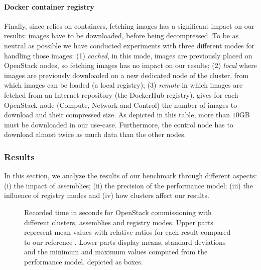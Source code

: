 \paragraph{Docker container registry}
Finally, since \kolla relies on \docker containers, fetching \docker images has a
significant impact on our results: images have to be downloaded, before being
decompressed. To be as neutral as possible we have conducted experiments with
three different modes for handling those images: (1) \emph{cached}, in this mode,
images are previously placed on OpenStack nodes, so fetching \docker images has
no impact on our results; (2) \emph{local} where images are previously
downloaded on a new dedicated node of the cluster, from which images can be
loaded (\ie a local \docker registry); (3) \emph{remote} in which images are
fetched from an Internet repository (\ie the DockerHub registry).
 gives for each OpenStack node (\ie Compute, Network and
Control) the number of \docker images to download and their compressed size.
As depicted in this table, more than $10$GB must be downloaded in our use-case.
Furthermore, the control node has to download almost twice as much data than the
other nodes.


\subsubsection{Results}

In this section, we analyze the results of our benchmark through different
aspects: (i) the impact of assemblies; (ii) the precision of the performance
model; (iii) the influence of registry modes and (iv) how clusters affect our
results.

\begin{figure}[t!]
  \begin{center}
    \def\svgwidth{\columnwidth}
    \def\svgwidth{\columnwidth}
    \caption{Recorded time in seconds for OpenStack commissioning with different
    clusters, assemblies and registry modes. Upper parts represent mean values
    with relative ratios for each result compared to our reference \ansass.
    Lower parts display means, standard deviations and the minimum and maximum
    values computed from the performance model, depicted as boxes.}
    \label{fig:openstack_results}
  \end{center}
\end{figure}

